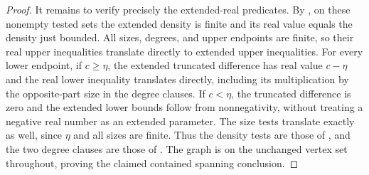 \begin{proof}
It remains to verify precisely the extended-real predicates.
By , on these nonempty tested sets the
extended density is finite and its real value equals the density
just bounded. All sizes, degrees, and upper endpoints are finite,
so their real upper inequalities translate directly to extended
upper inequalities. For every lower endpoint, if $c\geq\eta$,
the extended truncated difference has real value $c-\eta$ and
the real lower inequality translates directly, including its
multiplication by the opposite-part size in the degree clauses.
If $c<\eta$, the truncated difference is zero and the extended
lower bounds follow from nonnegativity, without treating a
negative real number as an extended parameter. The size tests
translate exactly as well, since $\eta$ and all sizes are finite.
Thus the density tests are those of , and
the two degree clauses are those of .
The graph is on the unchanged vertex set throughout, proving the
claimed contained spanning conclusion.
\end{proof}
